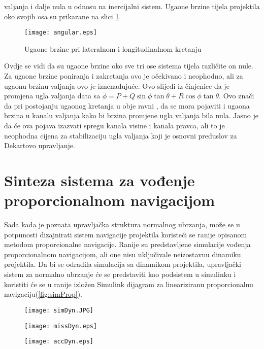 valjanja i dalje nula u odnosu na inercijalni sistem. Ugaone brzine tijela projektila oko 
svojih osa su prikazane na slici \ref{fig:angular}.
\begin{figure}[!ht]
    \centering
    \texttt{[image: angular.eps]}
    \caption{Ugaone brzine pri lateralnom i longitudinalnom kretanju}
    \label{fig:angular}
\end{figure}
Ovdje se vidi da su ugaone brzine oko sve tri ose sistema tijela različite on nule. 
Za ugaone brzine poniranja i zakretanja ovo je očekivano i neophodno, ali za ugaonu 
brzinu valjanja ovo je iznenađujuće. Ovo slijedi iz činjenice da je promjena ugla valjanja data sa 
$\dot{\phi} =P + Q\sin\phi\tan\theta + R\cos\phi\tan\theta$. Ovo znači da pri postojanju ugaonog kretanja u obje ravni
, da se mora pojaviti i ugaona brzina u kanalu valjanja kako bi brzina promjene ugla valjanja bila nula. 
Jasno je da će ova pojava izazvati spregu kanala visine i kanala pravca, ali to je neophodna 
cijena za stabilizaciju ugla valjanja koji je osnovni preduslov za Dekartovo upravljanje. 
\section{Sinteza sistema za vođenje proporcionalnom navigacijom}
Sada kada je poznata upravljačka struktura normalnog ubrzanja, može se u potpunosti dizajnirati 
sistem navigacije projektila koristeći se ranije opisanom metodom proporcionalne navigacije. Ranije 
su predstavljene simulacije vođenja proporcionalnom navigacijom, ali one nisu uključivale neizostavnu dinamiku projektila. 
Da bi se odradila simulacija sa dinamikom projektila, upravljački sistem za normalno ubrzanje će se predstaviti 
kao podsistem u simulinku i koristiti će se u ranije izložen Simulink dijagram za lineariziranu proporcionalnu navigaciju(\ref{fig:simProp}). 
\begin{figure}[!ht]
    \centering
    \texttt{[image: simDyn.JPG]}
\end{figure}

\begin{figure}[!ht]
    \centering
    \texttt{[image: missDyn.eps]}
\end{figure}
\begin{figure}[!ht]
    \centering
    \texttt{[image: accDyn.eps]}
\end{figure}

